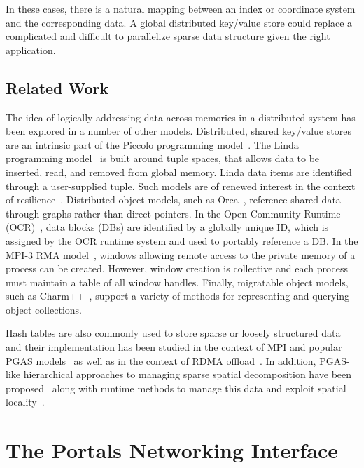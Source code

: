 In these cases, there is a natural mapping between an index or
coordinate system and the corresponding data. A global distributed
key/value store could replace a complicated and difficult to parallelize
sparse data structure given the right application.

\subsection{Related Work}

The idea of logically addressing data across memories in a distributed
system has been explored in a number of other models.  Distributed,
shared key/value stores are an intrinsic part of the Piccolo
programming model~\cite{power:10}.  The Linda programming
model~\cite{ahuja:86} is built around tuple spaces, that allows data
to be inserted, read, and removed from global memory. Linda data items
are identified through a user-supplied tuple.  Such models are of
renewed interest in the context of resilience~\cite{wilke:14}.
Distributed object models, such as Orca~\cite{bal:92}, reference
shared data through graphs rather than direct pointers.  In the Open
Community Runtime (OCR)~\cite{OCR}, data blocks (DBs) are identified
by a globally unique ID, which is assigned by the OCR runtime system
and used to portably reference a DB.
In the MPI-3 RMA model~\cite{mpi-forum:15}, windows allowing remote
access to the private memory of a process can be created.  However,
window creation is collective and each process must maintain a table of
all window handles.
Finally, migratable object
models, such as Charm++~\cite{kale:93}, support a variety of methods
for representing and querying object collections.

Hash tables are also commonly used to store sparse or loosely structured
data~\cite{memcached04,chord01,docan:12}
and their implementation has been studied in the context of MPI and popular PGAS
models~\cite{zht13,fompi13,cmpi10,maynard:12,memcached12,mht15} as well as in
the context of RDMA offload~\cite{memcached12,mitchell:13,kalia:14}.  In
addition, PGAS-like hierarchical approaches to
managing sparse spatial decomposition have been proposed~\cite{larkins:08}
along with runtime methods to manage this data and exploit spatial
locality~\cite{larkins:12}.

\section{The Portals Networking Interface}

